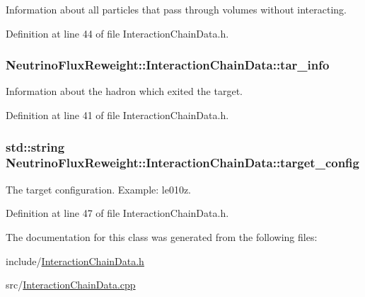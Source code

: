 Information about all particles that pass through volumes without interacting. 



Definition at line 44 of file Interaction\-Chain\-Data.\-h.

\hypertarget{class_neutrino_flux_reweight_1_1_interaction_chain_data_a6df89bff97001a4988487fcfb9f4acea}{
\subsubsection[{tar\-\_\-info}]{ Neutrino\-Flux\-Reweight\-::\-Interaction\-Chain\-Data\-::tar\-\_\-info}}\label{class_neutrino_flux_reweight_1_1_interaction_chain_data_a6df89bff97001a4988487fcfb9f4acea}


Information about the hadron which exited the target. 



Definition at line 41 of file Interaction\-Chain\-Data.\-h.

\hypertarget{class_neutrino_flux_reweight_1_1_interaction_chain_data_a8362a0f94df2bd321e0b60a38c41fb7a}{
\subsubsection[{target\-\_\-config}]{\setlength{\rightskip}{0pt plus 5cm}std\-::string Neutrino\-Flux\-Reweight\-::\-Interaction\-Chain\-Data\-::target\-\_\-config}}\label{class_neutrino_flux_reweight_1_1_interaction_chain_data_a8362a0f94df2bd321e0b60a38c41fb7a}


The target configuration. Example\-: le010z. 



Definition at line 47 of file Interaction\-Chain\-Data.\-h.



The documentation for this class was generated from the following files\-:\begin{DoxyCompactItemize}
\item 
include/\hyperlink{_interaction_chain_data_8h}{Interaction\-Chain\-Data.\-h}\item 
src/\hyperlink{_interaction_chain_data_8cpp}{Interaction\-Chain\-Data.\-cpp}\end{DoxyCompactItemize}
